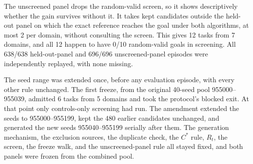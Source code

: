 The unscreened panel drops the random-valid screen, so it shows descriptively whether the gain survives without it. It takes kept candidates outside the held-out panel on which the exact reference reaches the goal under both algorithms, at most 2 per domain, without consulting the screen. This gives 12 tasks from 7 domains, and all 12 happen to have 0/10 random-valid goals in screening. All 638/638 held-out-panel and 696/696 unscreened-panel episodes were independently replayed, with none missing.

The seed range was extended once, before any evaluation episode, with every other rule unchanged. The first freeze, from the original 40-seed pool 955000--955039, admitted 6 tasks from 5 domains and took the protocol's blocked exit. At that point only controls-only screening had run. The amendment extended the seeds to 955000--955199, kept the 480 earlier candidates unchanged, and generated the new seeds 955040--955199 serially after them. The generation mechanism, the exclusion sources, the duplicate check, the $C^*$ rule, $R_t$, the screen, the freeze walk, and the unscreened-panel rule all stayed fixed, and both panels were frozen from the combined pool.

